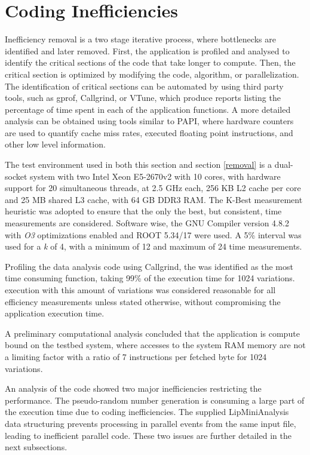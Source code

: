 \section{Coding Inefficiencies}
\label{identification}

Inefficiency removal is a two stage iterative process, where bottlenecks are identified and later removed. First, the application is profiled and analysed to identify the critical sections of the code that take longer to compute. Then, the critical section is optimized by modifying the code, algorithm, or parallelization. The identification of critical sections can be automated by using third party tools, such as gprof\cite{GPROF}, Callgrind\cite{Callgrind}, or VTune\cite{Intel:VTune}, which produce reports listing the percentage of time spent in each of the application functions. A more detailed analysis can be obtained using tools similar to PAPI\cite{PAPI}, where hardware counters are used to quantify cache miss rates, executed floating point instructions, and other low level information.

The test environment used in both this section and section \ref{removal} is a dual-socket system with two Intel Xeon E5-2670v2\cite{Intel:e5v2} with 10 cores, with hardware support for 20 simultaneous threads, at 2.5 GHz each, 256 KB L2 cache per core and 25 MB shared L3 cache, with 64 GB DDR3 RAM. The K-Best measurement heuristic was adopted to ensure that the only the best, but consistent, time measurements are considered. Software wise, the GNU Compiler version 4.8.2 with \textit{O3} optimizations enabled and ROOT 5.34/17 were used. A 5\% interval was used for a \textit{k} of 4, with a minimum of 12 and maximum of 24 time measurements.

Profiling the data analysis code using Callgrind, the \ttDilepKinFit was identified as the most time consuming function, taking 99\% of the execution time for 1024 variations. \tth execution with this amount of variations was considered reasonable for all efficiency measurements unless stated otherwise, without compromising the application execution time.

A preliminary computational analysis concluded that the application is compute bound on the testbed system, where accesses to the system RAM memory are not a limiting factor with a ratio of 7 instructions per fetched byte for 1024 variations.

An analysis of the code showed two major inefficiencies restricting the performance. The pseudo-random number generation is consuming a large part of the \ttDilepKinFit execution time due to coding inefficiencies. The supplied LipMiniAnalysis data structuring prevents processing in parallel events from the same input file, leading to inefficient parallel code. These two issues are further detailed in the next subsections.

